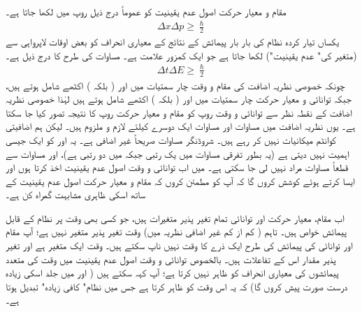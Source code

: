 مقام و معیار حرکت  اصول عدم یقینیت  کو عموماً درج ذیل روپ میں لکھا جاتا ہے۔
\begin{align}\label{مساوات_قواعد_اصول_مقام_و_معیار_حرکت_عدم_یقینیت}
\Delta x \Delta p \geq \frac{\hslash}{2} 
\end{align}
یکساں تیار کردہ نظام کی بار بار  پیمائش کے نتائج کے معیاری انحراف کو بعض اوقات لاپرواہی سے  (متغیر  کی" عدم یقینیت")  لکھا جاتا ہے جو ایک کمزور علامت ہے۔ مساوات  کی طرح کا   درج ذیل ہے۔
\begin{align}\label{مساوات_قواعد_اصول_وقت_و_توانائی_عدم_یقینیت}
\Delta t \Delta E \geq \frac{\hslash}{2}
\end{align}
چونکہ خصوصی نظریہ اضافت کی مقام و وقت چار سمتیات میں  اور  ( بلکہ ) اکٹھے          شامل ہوتے ہیں، جبکہ توانائی و معیار حرکت چار سمتیات میں  اور  ( بلکہ ) اکٹھے  شامل ہوتے ہیں  لہٰذا خصوصی نظریہ اضافت کے نقطہ نظر سے توانائی و وقت  روپ کو مقام و معیار حرکت روپ کا نتیجہ تصور کیا جا سکتا ہے۔ یوں نظریہ اضافت میں مساوات  اور مساوات  ایک دوسرے کیلئے لازم و ملزوم ہیں۔ لیکن ہم اضافیتی  کوانٹم میکانیات نہیں کر رہے ہیں۔ شروڈنگر مساوات صریحاً غیر اضافی ہے۔ یہ  اور  کو ایک جیسی اہمیت نہیں دیتی ہے (یہ  بطور تفرقی مساوات   میں یک رتبی جبکہ  میں دو رتبی ہے)،    اور
  مساوات    سے  قطعاً   مساوات     مراد  نہیں  لی جا سکتی ہے۔ میں اب توانائی و وقت اصول  عدم یقینیت   اخذ کرتا ہوں اور ایسا کرتے ہوئے کوشش کروں گا کہ آپ کو مطمئن کروں کہ مقام و معیار حرکت  اصول  عدم یقینیت کے ساتھ اسکی ظاہری مشابہت گمراہ کن ہے۔
  
اب مقام،  معیار حرکت اور توانائی تمام   تغیر پذیر  متغیرات  ہیں،  جو کسی بھی وقت پر  نظام کے قابل پیمائش خواص ہیں۔ تاہم ( کم  از  کم غیر اضافی نظریہ میں)  وقت    تغیر پذیر   متغیر نہیں   ہے؛  آپ مقام اور توانائی کی پیمائش کی  طرح ایک ذرے کا وقت نہیں ناپ سکتے ہیں۔ وقت ایک  متغیر ہے  اور    تغیر پذیر مقدار اس کے     تفاعلات  ہیں۔ بالخصوص توانائی و وقت اصول  عدم یقینیت  میں  وقت کی متعدد  پیمائشوں کی معیاری انحراف کو  ظاہر نہیں کرتا ہے؛  آپ کہہ سکتے ہیں ( اور میں جلد اسکی زیادہ درست صورت پیش کروں گا)  کہ یہ اس وقت کو ظاہر کرتا ہے جس میں نظام"  کافی زیادہ"   تبدیل ہوتا ہے۔

